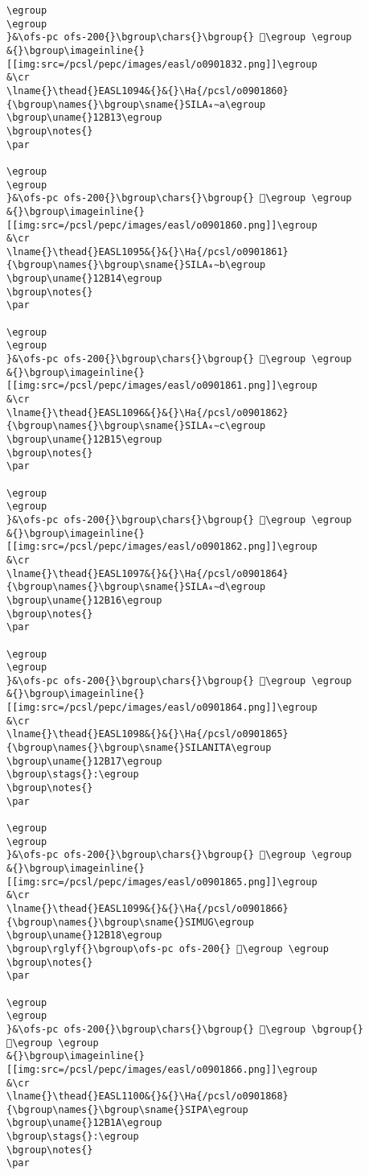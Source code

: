 \begin{verbatim}
\egroup
\egroup
}&\ofs-pc ofs-200{}\bgroup\chars{}\bgroup{} 𒬒\egroup \egroup
&{}\bgroup\imageinline{}[[img:src=/pcsl/pepc/images/easl/o0901832.png]]\egroup
&\cr
\lname{}\thead{}EASL1094&{}&{}\Ha{/pcsl/o0901860}{\bgroup\names{}\bgroup\sname{}SILA₄∼a\egroup
\bgroup\uname{}12B13\egroup
\bgroup\notes{}
\par 

\egroup
\egroup
}&\ofs-pc ofs-200{}\bgroup\chars{}\bgroup{} 𒬓\egroup \egroup
&{}\bgroup\imageinline{}[[img:src=/pcsl/pepc/images/easl/o0901860.png]]\egroup
&\cr
\lname{}\thead{}EASL1095&{}&{}\Ha{/pcsl/o0901861}{\bgroup\names{}\bgroup\sname{}SILA₄∼b\egroup
\bgroup\uname{}12B14\egroup
\bgroup\notes{}
\par 

\egroup
\egroup
}&\ofs-pc ofs-200{}\bgroup\chars{}\bgroup{} 𒬔\egroup \egroup
&{}\bgroup\imageinline{}[[img:src=/pcsl/pepc/images/easl/o0901861.png]]\egroup
&\cr
\lname{}\thead{}EASL1096&{}&{}\Ha{/pcsl/o0901862}{\bgroup\names{}\bgroup\sname{}SILA₄∼c\egroup
\bgroup\uname{}12B15\egroup
\bgroup\notes{}
\par 

\egroup
\egroup
}&\ofs-pc ofs-200{}\bgroup\chars{}\bgroup{} 𒬕\egroup \egroup
&{}\bgroup\imageinline{}[[img:src=/pcsl/pepc/images/easl/o0901862.png]]\egroup
&\cr
\lname{}\thead{}EASL1097&{}&{}\Ha{/pcsl/o0901864}{\bgroup\names{}\bgroup\sname{}SILA₄∼d\egroup
\bgroup\uname{}12B16\egroup
\bgroup\notes{}
\par 

\egroup
\egroup
}&\ofs-pc ofs-200{}\bgroup\chars{}\bgroup{} 𒬖\egroup \egroup
&{}\bgroup\imageinline{}[[img:src=/pcsl/pepc/images/easl/o0901864.png]]\egroup
&\cr
\lname{}\thead{}EASL1098&{}&{}\Ha{/pcsl/o0901865}{\bgroup\names{}\bgroup\sname{}SILANITA\egroup
\bgroup\uname{}12B17\egroup
\bgroup\stags{}:\egroup
\bgroup\notes{}
\par 

\egroup
\egroup
}&\ofs-pc ofs-200{}\bgroup\chars{}\bgroup{} 𒬗\egroup \egroup
&{}\bgroup\imageinline{}[[img:src=/pcsl/pepc/images/easl/o0901865.png]]\egroup
&\cr
\lname{}\thead{}EASL1099&{}&{}\Ha{/pcsl/o0901866}{\bgroup\names{}\bgroup\sname{}SIMUG\egroup
\bgroup\uname{}12B18\egroup
\bgroup\rglyf{}\bgroup\ofs-pc ofs-200{} 𒬘\egroup \egroup
\bgroup\notes{}
\par 

\egroup
\egroup
}&\ofs-pc ofs-200{}\bgroup\chars{}\bgroup{} 𒬘\egroup \bgroup{} 𒬙\egroup \egroup
&{}\bgroup\imageinline{}[[img:src=/pcsl/pepc/images/easl/o0901866.png]]\egroup
&\cr
\lname{}\thead{}EASL1100&{}&{}\Ha{/pcsl/o0901868}{\bgroup\names{}\bgroup\sname{}SIPA\egroup
\bgroup\uname{}12B1A\egroup
\bgroup\stags{}:\egroup
\bgroup\notes{}
\par 


\end{verbatim}
